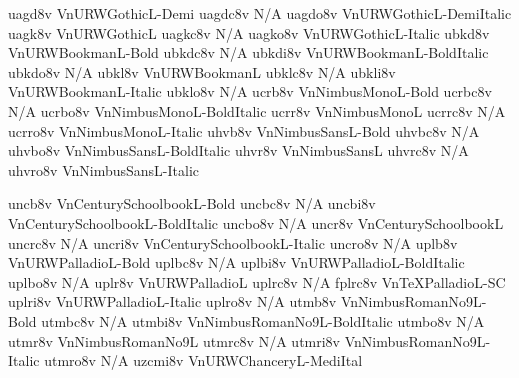 \documentclass[test]{vnsample}
\begin{document}
\clearpage
\begin{shortsample}
  {uagd8v}  {VnURWGothicL-Demi}
 {uagdc8v} {N/A}
 {uagdo8v} {VnURWGothicL-DemiItalic}
   {uagk8v}  {VnURWGothicL}
  {uagkc8v} {N/A}
  {uagko8v} {VnURWGothicL-Italic}
%
  {ubkd8v}  {VnURWBookmanL-Bold}
 {ubkdc8v} {N/A}
 {ubkdi8v} {VnURWBookmanL-BoldItalic}
 {ubkdo8v} {N/A}
   {ubkl8v}  {VnURWBookmanL}
  {ubklc8v} {N/A}
  {ubkli8v} {VnURWBookmanL-Italic}
  {ubklo8v} {N/A}
%
   {ucrb8v}  {VnNimbusMonoL-Bold}
  {ucrbc8v} {N/A}
  {ucrbo8v} {VnNimbusMonoL-BoldItalic}
   {ucrr8v}  {VnNimbusMonoL}
  {ucrrc8v} {N/A}
  {ucrro8v} {VnNimbusMonoL-Italic}
%
   {uhvb8v}  {VnNimbusSansL-Bold}
  {uhvbc8v} {N/A}
  {uhvbo8v} {VnNimbusSansL-BoldItalic}
   {uhvr8v}  {VnNimbusSansL}
  {uhvrc8v} {N/A}
  {uhvro8v} {VnNimbusSansL-Italic}
\end{shortsample}
\clearpage
\begin{shortsample}
   {uncb8v}  {VnCenturySchoolbookL-Bold}
  {uncbc8v} {N/A}
  {uncbi8v} {VnCenturySchoolbookL-BoldItalic}
  {uncbo8v} {N/A}
   {uncr8v}  {VnCenturySchoolbookL}
  {uncrc8v} {N/A}
  {uncri8v} {VnCenturySchoolbookL-Italic}
  {uncro8v} {N/A}
%
   {uplb8v}  {VnURWPalladioL-Bold}
  {uplbc8v} {N/A}
  {uplbi8v} {VnURWPalladioL-BoldItalic}
  {uplbo8v} {N/A}
   {uplr8v}  {VnURWPalladioL}
%
  {uplrc8v} {N/A}
  {fplrc8v} {VnTeXPalladioL-SC}
%
  {uplri8v} {VnURWPalladioL-Italic}
  {uplro8v} {N/A}
%
   {utmb8v}  {VnNimbusRomanNo9L-Bold}
  {utmbc8v} {N/A}
  {utmbi8v} {VnNimbusRomanNo9L-BoldItalic}
  {utmbo8v} {N/A}
   {utmr8v}  {VnNimbusRomanNo9L}
  {utmrc8v} {N/A}
  {utmri8v} {VnNimbusRomanNo9L-Italic}
  {utmro8v} {N/A}
 {uzcmi8v}  {VnURWChanceryL-MediItal}
\end{shortsample}
\end{document}
